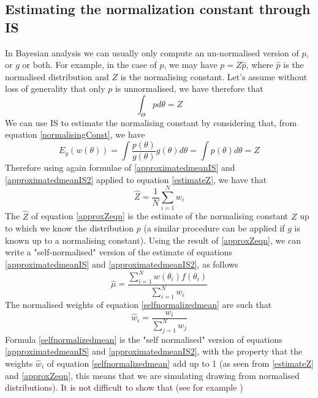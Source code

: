 \documentclass[12pt,mythesisstyle]{report}
\begin{document}
\subsection{Estimating the normalization constant through IS}
In Bayesian analysis we can usually only compute an un-normalised version of $p$, or $g$ or both. For example, in the case of $p$, we may have $p=Z\hat{p}$, where $\hat{p}$ is the normalised distribution and $Z$ is the normalising constant. Let's assume without loss of generality that only $p$ is unnormalised, we have therefore that
\begin{equation}\label{normalisingConst}
\int_\Theta p d\theta=Z 
\end{equation}
We can use IS to estimate the normalising constant by considering that, from equation \eqref{normalisingConst}, we have
\begin{equation}\label{estimateZ}
E_{g}(w(\theta))=\int \frac{p(\theta)}{g(\theta)}g(\theta) d\theta= \int p(\theta) d\theta=Z
\end{equation}
Therefore using again formulae of \eqref{approximatedmeanIS} and \eqref{approximatedmeanIS2} applied to equation \eqref{estimateZ}, we have that
\begin{equation}\label{approxZeqn}
\hat{Z}=\frac{1}{N}\sum_{i=1}^{N}w_{i}
\end{equation}
The $\hat{Z}$ of equation \eqref{approxZeqn} is the estimate of the normalising constant $Z$ up to which we know the distribution $p$ (a similar procedure can be applied if $g$ is known up to a normalising constant). Using the result of \eqref{approxZeqn}, we can write a "self-normalised" version of the estimate of equations \eqref{approximatedmeanIS} and \eqref{approximatedmeanIS2}, as follows
\begin{equation}\label{selfnormalizedmean}
\hat{\mu}=\frac{\sum_{i=1}^{N}w(\theta_{i})f(\theta_{i})}{\sum_{i=1}^{N}w_{i}}
\end{equation}
The normalised weights of equation \eqref{selfnormalizedmean} are such that
\begin{equation}\label{selfnormalizedweight}
\hat{w}_{i}=\frac{w_{i}}{\sum_{j=1}^{N}w_{j}}
\end{equation}
Formula  \eqref{selfnormalizedmean} is the "self normalised" version of equations \eqref{approximatedmeanIS} and \eqref{approximatedmeanIS2}, with the property that the weights $\hat{w}_{i}$ of equation  \eqref{selfnormalizedmean} add up to 1 (as seen from \eqref{estimateZ} and \eqref{approxZeqn}, this means that we are simulating drawing from normalised distributions). It is not difficult to show that (see for example \cite{mcmcnotes}) 
\end{document}
